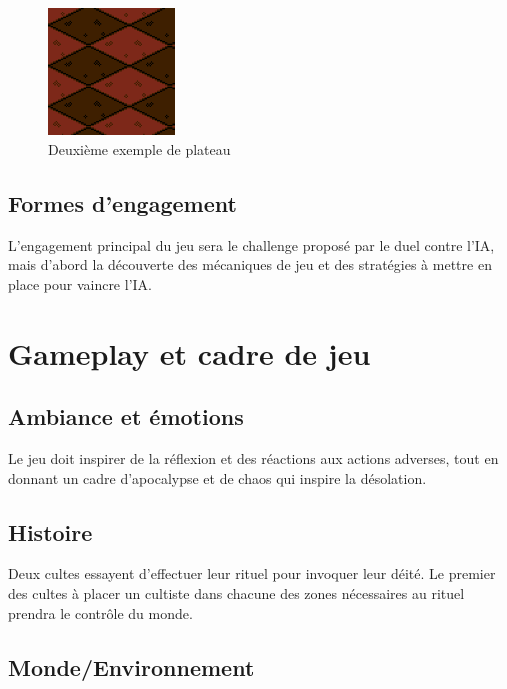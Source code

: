 \documentclass[a4paper]{scrreprt}
\begin{document}
\begin{figure}
\centering
\includegraphics[width=0.3\textwidth]{example2.png}
\caption{\label{fig:art} Deuxième exemple de plateau}
\end{figure}

\section{Formes d'engagement}

L'engagement principal du jeu sera le challenge proposé par le duel contre l'IA, mais d'abord la découverte des mécaniques de jeu et des stratégies à mettre en place pour vaincre l'IA.



\chapter{Gameplay et cadre de jeu}

\section{Ambiance et émotions}

Le jeu doit inspirer de la réflexion et des réactions aux actions adverses, tout en donnant un cadre d'apocalypse et de chaos qui inspire la désolation.

\section{Histoire}

Deux cultes essayent d'effectuer leur rituel pour invoquer leur déité. Le premier des cultes à placer un cultiste dans chacune des zones nécessaires au rituel prendra le contrôle du monde.

\section{Monde/Environnement}
\end{document}
